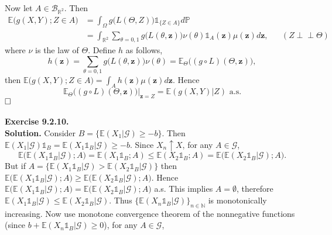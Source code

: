 \documentclass[12pt]{extarticle}
\begin{document}
Now let $A\in\mathcal{B}_{\mathbb{R}^2}$. Then
\begin{equation*}
\begin{aligned}
\mathbb{E}\big(g(X,Y);Z\in A) &= \int_{\Omega}g\big(L(\Theta,Z)\big)\mathds{1}_{\{Z\in A\}}d\mathbb{P} \\&
=\int_{\mathbb{R}^2}\sum_{\theta=0,1}g\big(L(\theta,\mathbf{z})\big)\nu(\theta)\mathds{1}_A(\mathbf{z})\mu(\mathbf{z}) d\mathbf{z}, && (Z\perp\!\!\!\perp\Theta)
\end{aligned}
\end{equation*}
where $\nu$ is the law of $\Theta$. Define $h$ as follows,
\begin{equation*}
h(\mathbf{z})=\sum_{\theta=0,1}g\big(L(\theta,\mathbf{z})\big)\nu(\theta) =\mathbb{E}_\Theta\big((g\circ L)(\Theta,\mathbf{z})\big),
\end{equation*}
then $\mathbb{E}\big(g(X,Y);Z\in A)=\int_Ah(\mathbf{z})\mu(\mathbf{z})d\mathbf{z}$. Hence
\begin{equation*}
\mathbb{E}_\Theta\big((g\circ L)(\Theta,\mathbf{z})\big)\big|_{\mathbf{z}=Z}=\mathbb{E}(g(X,Y)|Z)\text{ a.s.}
\end{equation*}
$\hspace{\fill}\square$
\\ \\
\textbf{Exercise 9.2.10.}\\
\textbf{Solution.} Consider $B = \{\mathbb{E}(X_1|\mathcal{G})\geq -b\}$. Then $\mathbb{E}(X_1|\mathcal{G})\mathds{1}_B=\mathbb{E}(X_1\mathds{1}_B|\mathcal{G})\geq -b$. 
Since $X_n\uparrow X$, for any $A\in\mathcal{G}$,
\[
\mathbb{E}\big(\mathbb{E}(X_1\mathds{1}_B|\mathcal{G});A\big)=\mathbb{E}(X_1\mathds{1}_B;A)\leq \mathbb{E}(X_2\mathds{1}_B;A)=\mathbb{E}\big(\mathbb{E}(X_2\mathds{1}_B|\mathcal{G});A\big).
\]
But if $A=\{\mathbb{E}(X_1\mathds{1}_B|\mathcal{G})>\mathbb{E}(X_2\mathds{1}_B|\mathcal{G})\}$ then $\mathbb{E}\big(\mathbb{E}(X_1\mathds{1}_B|\mathcal{G});A\big)\geq\mathbb{E}\big(\mathbb{E}(X_2\mathds{1}_B|\mathcal{G});A\big)$. 
Hence $\mathbb{E}\big(\mathbb{E}(X_1\mathds{1}_B|\mathcal{G});A\big)=\mathbb{E}\big(\mathbb{E}(X_2\mathds{1}_B|\mathcal{G});A\big)$ a.s. This implies $A=\emptyset$, therefore $\mathbb{E}(X_1\mathds{1}_B|\mathcal{G})\leq\mathbb{E}(X_2\mathds{1}_B|\mathcal{G})$. Thus $\{\mathbb{E}(X_n\mathds{1}_B|\mathcal{G})\}_{n\in\mathbb{N}}$ is monotonically increasing. Now use monotone convergence theorem of the nonnegative functions (since $b+\mathbb{E}(X_n\mathds{1}_B|\mathcal{G})\geq 0$), for any $A\in\mathcal{G}$,
\end{document}
